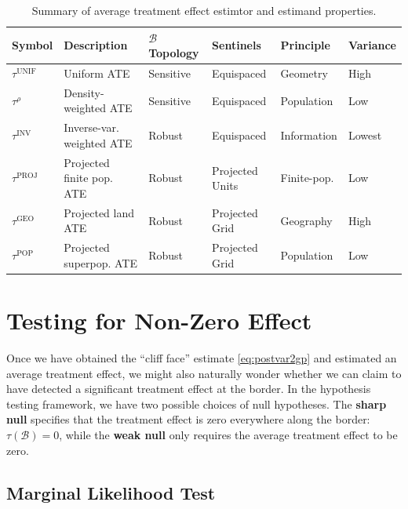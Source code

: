 \documentclass[letter]{article}
\newcommand{\border}{\mathcal{B}}
\newcommand{\unifavg}{\tau^{\mathrm{UNIF}}}
\newcommand{\invvar}{\tau^{\mathrm{INV}}}
\newcommand{\taurho}{\tau^{\rho}}
\newcommand{\tauproj}{\tau^{\mathrm{PROJ}}}
\newcommand{\taugeo}{\tau^{\mathrm{GEO}}}
\newcommand{\taupop}{\tau^{\mathrm{POP}}}
\begin{document}
\begin{table}[tbp]
\centering
\caption{Summary of average treatment effect estimtor and estimand properties.}
\begin{tabular}{llllll}
\hline
Symbol     & Description                     & $\border$ Topology & Sentinels       & Principle         & Variance \\
\hline
$\unifavg$ & Uniform ATE                     & Sensitive       & Equispaced      & Geometry    & High     \\
$\taurho$  & Density-weighted ATE            & Sensitive       & Equispaced      & Population  & Low      \\
$\invvar$  & Inverse-var. weighted ATE   & Robust          & Equispaced      & Information & Lowest   \\
$\tauproj$ & Projected finite pop. ATE & Robust          & Projected Units & Finite-pop. & Low      \\
$\taugeo$  & Projected land ATE              & Robust          & Projected Grid  & Geography   & High     \\
$\taupop$  & Projected superpop. ATE   & Robust          & Projected Grid  & Population  & Low     
\end{tabular}
\label{table:estimator_properties}
\end{table}
    	\hypertarget{testing-for-non-zero-effect}{%
\section{Testing for Non-Zero Effect}\label{testing-for-non-zero-effect}}
    

\label{sec:hypothesis_testing}
    	Once we have obtained the ``cliff face'' estimate \eqref{eq:postvar2gp} and estimated an average treatment effect, we might also naturally wonder whether we can claim to have detected a significant treatment effect at the border.
In the hypothesis testing framework, we have two possible choices of null hypotheses.
The \textbf{sharp null} specifies that the treatment effect is zero everywhere along the border:
\(\tau(\border)=0\),
while the \textbf{weak null} only requires the average treatment effect to be zero.
    


    	\hypertarget{marginal-likelihood-test}{%
\subsection{Marginal Likelihood Test}\label{marginal-likelihood-test}}
\end{document}

